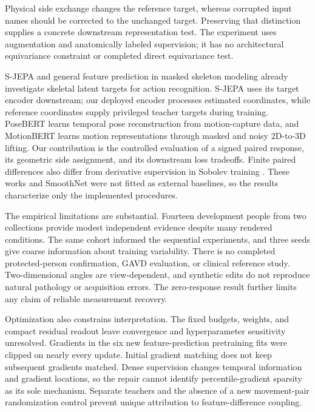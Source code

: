 \documentclass{article}
\begin{document}
Physical side exchange changes the reference target, whereas corrupted input names should be corrected to the unchanged target. Preserving that distinction supplies a concrete downstream representation test. The experiment uses augmentation and anatomically labeled supervision; it has no architectural equivariance constraint or completed direct equivariance test.

S-JEPA \citep{abdelfattah2024sjepa} and general feature prediction in masked skeleton modeling \citep{sun2025gfp} already investigate skeletal latent targets for action recognition. S-JEPA uses its target encoder downstream; our deployed encoder processes estimated coordinates, while reference coordinates supply privileged teacher targets during training. PoseBERT \citep{baradel2022posebert} learns temporal pose reconstruction from motion-capture data, and MotionBERT \citep{zhu2023motionbert} learns motion representations through masked and noisy 2D-to-3D lifting. Our contribution is the controlled evaluation of a signed paired response, its geometric side assignment, and its downstream loss tradeoffs. Finite paired differences also differ from derivative supervision in Sobolev training \citep{czarnecki2017sobolev}. These works and SmoothNet \citep{zeng2022smoothnet} were not fitted as external baselines, so the results characterize only the implemented procedures.

The empirical limitations are substantial. Fourteen development people from two collections provide modest independent evidence despite many rendered conditions. The same cohort informed the sequential experiments, and three seeds give coarse information about training variability. There is no completed protected-person confirmation, GAVD evaluation, or clinical reference study. Two-dimensional angles are view-dependent, and synthetic edits do not reproduce natural pathology or acquisition errors. The zero-response result further limits any claim of reliable measurement recovery.

Optimization also constrains interpretation. The fixed budgets, weights, and compact residual readout leave convergence and hyperparameter sensitivity unresolved. Gradients in the six new feature-prediction pretraining fits were clipped on nearly every update. Initial gradient matching does not keep subsequent gradients matched. Dense supervision changes temporal information and gradient locations, so the repair cannot identify percentile-gradient sparsity as its sole mechanism. Separate teachers and the absence of a new movement-pair randomization control prevent unique attribution to feature-difference coupling.
\end{document}

